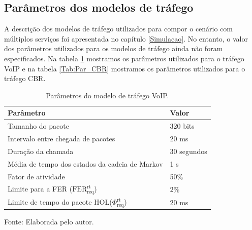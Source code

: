\subsection{Parâmetros dos modelos de tráfego}

A descrição dos modelos de tráfego utilizados para compor o cenário com múltiplos serviços foi apresentada no capítulo \ref{Simulacao}. No entanto, o valor dos parâmetros utilizados para os modelos de tráfego ainda não foram especificados. Na tabela \ref{Tab:Par_VOIP} mostramos os parâmetros utilizados para o tráfego VoIP e na tabela \ref{Tab:Par_CBR} mostramos os parâmetros utilizados para o tráfego CBR. 

\begin{table}[!ht]
	\centering
	\begin{threeparttable}[t]
		\caption{Parâmetros do modelo de tráfego VoIP.}
		\label{Tab:Par_VOIP}
		\centering
		\small
		\begin{tabular}[t]{ll}
			\toprule
			\textbf{Parâmetro} & \textbf{Valor}\\
			\midrule
			Tamanho do pacote & 320 bits\\
			\midrule
			Intervalo entre chegada de pacotes & 20 ms\\
			\midrule
			Duração da chamada & 30 segundos\\
			\midrule
			Média de tempo dos estados da cadeia de Markov & 1 s\\
			\midrule
			Fator de atividade & 50\%\\
			\midrule
			Limite para a FER ($\text{FER}_{\text{req}}^{\text{rt}}$)& 2\%\\
			\midrule
			Limite de tempo do pacote HOL($\Phi_{\text{req}}^{\text{rt}}$) & 20 ms\\
			\bottomrule
		\end{tabular}
		{Fonte: Elaborada pelo autor.}
	\end{threeparttable}
\end{table}

